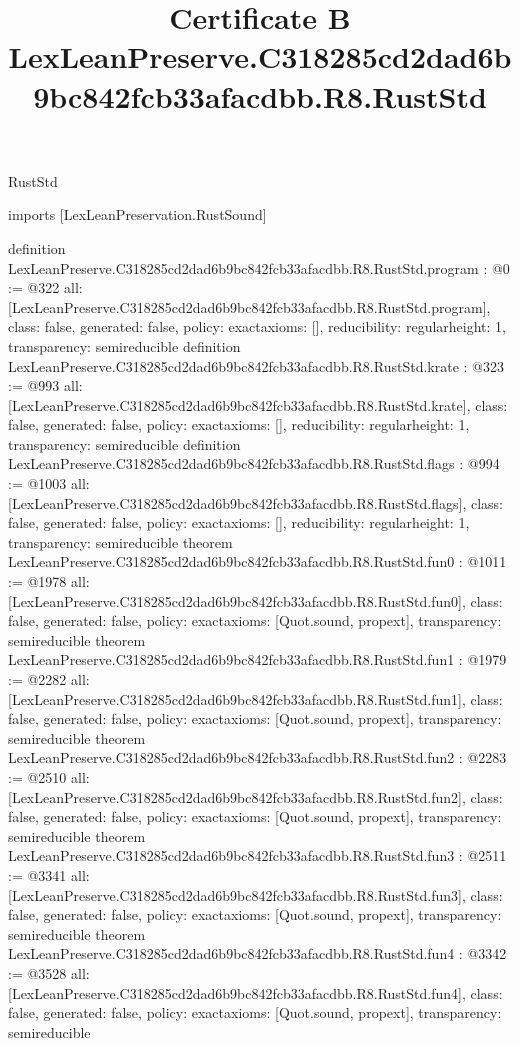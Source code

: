 \begin{lexlean}{RustStd}
\title{Certificate B LexLeanPreserve.C318285cd2dad6b9bc842fcb33afacdbb.R8.RustStd}
\begin{coremodule}
imports [LexLeanPreservation.RustSound]

definition LexLeanPreserve.C318285cd2dad6b9bc842fcb33afacdbb.R8.RustStd.program : @0 := @322 {
  all: [LexLeanPreserve.C318285cd2dad6b9bc842fcb33afacdbb.R8.RustStd.program],
  class: false,
  generated: false,
  policy: exact{axioms: []},
  reducibility: regular{height: 1},
  transparency: semireducible
}
definition LexLeanPreserve.C318285cd2dad6b9bc842fcb33afacdbb.R8.RustStd.krate : @323 := @993 {
  all: [LexLeanPreserve.C318285cd2dad6b9bc842fcb33afacdbb.R8.RustStd.krate],
  class: false,
  generated: false,
  policy: exact{axioms: []},
  reducibility: regular{height: 1},
  transparency: semireducible
}
definition LexLeanPreserve.C318285cd2dad6b9bc842fcb33afacdbb.R8.RustStd.flags : @994 := @1003 {
  all: [LexLeanPreserve.C318285cd2dad6b9bc842fcb33afacdbb.R8.RustStd.flags],
  class: false,
  generated: false,
  policy: exact{axioms: []},
  reducibility: regular{height: 1},
  transparency: semireducible
}
theorem LexLeanPreserve.C318285cd2dad6b9bc842fcb33afacdbb.R8.RustStd.fun0 : @1011 := @1978 {
  all: [LexLeanPreserve.C318285cd2dad6b9bc842fcb33afacdbb.R8.RustStd.fun0],
  class: false,
  generated: false,
  policy: exact{axioms: [Quot.sound, propext]},
  transparency: semireducible
}
theorem LexLeanPreserve.C318285cd2dad6b9bc842fcb33afacdbb.R8.RustStd.fun1 : @1979 := @2282 {
  all: [LexLeanPreserve.C318285cd2dad6b9bc842fcb33afacdbb.R8.RustStd.fun1],
  class: false,
  generated: false,
  policy: exact{axioms: [Quot.sound, propext]},
  transparency: semireducible
}
theorem LexLeanPreserve.C318285cd2dad6b9bc842fcb33afacdbb.R8.RustStd.fun2 : @2283 := @2510 {
  all: [LexLeanPreserve.C318285cd2dad6b9bc842fcb33afacdbb.R8.RustStd.fun2],
  class: false,
  generated: false,
  policy: exact{axioms: [Quot.sound, propext]},
  transparency: semireducible
}
theorem LexLeanPreserve.C318285cd2dad6b9bc842fcb33afacdbb.R8.RustStd.fun3 : @2511 := @3341 {
  all: [LexLeanPreserve.C318285cd2dad6b9bc842fcb33afacdbb.R8.RustStd.fun3],
  class: false,
  generated: false,
  policy: exact{axioms: [Quot.sound, propext]},
  transparency: semireducible
}
theorem LexLeanPreserve.C318285cd2dad6b9bc842fcb33afacdbb.R8.RustStd.fun4 : @3342 := @3528 {
  all: [LexLeanPreserve.C318285cd2dad6b9bc842fcb33afacdbb.R8.RustStd.fun4],
  class: false,
  generated: false,
  policy: exact{axioms: [Quot.sound, propext]},
  transparency: semireducible
}
\end{coremodule}
\end{lexlean}

